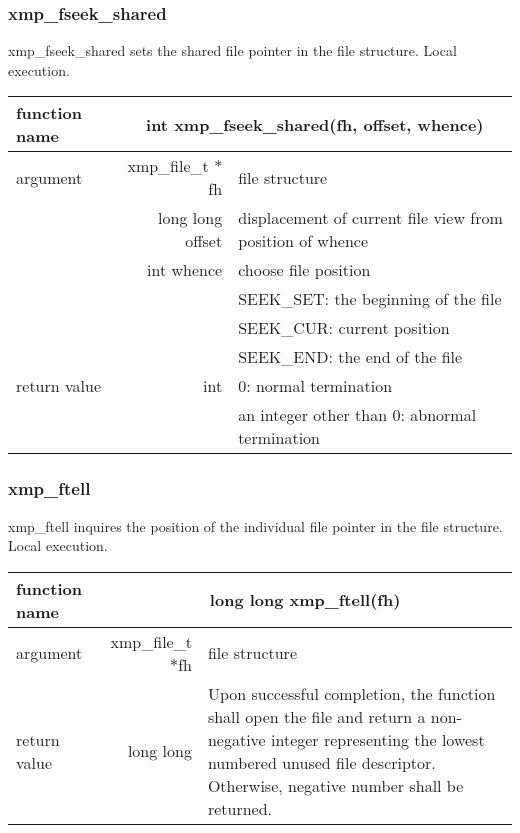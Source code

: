    \clearpage

   \subsubsection{xmp\_fseek\_shared}
   xmp\_fseek\_shared sets the shared file pointer in the file structure. Local execution.

   \begin{table}[h]
    \begin{center}
     \begin{tabular}{|l|r|p{80mm}|}
      \hline
      {\bf function name}  & \multicolumn{2}{c|}{\bf int xmp\_fseek\_shared(fh,
      offset, whence)}  \\ \hline \hline
      argument & xmp\_file\_t $*$fh & file structure \\ \cline{2-3}
      & long long offset & displacement of current file view from
	      position of whence \\ \cline{2-3}
      & int whence & choose file position \\
      &  & SEEK\_SET: the beginning of the file \\ 
      &  & SEEK\_CUR: current position \\ 
      &  & SEEK\_END: the end of the file \\ \hline
      return value & int & 0: normal termination \\
      &  & an integer other than 0: abnormal termination \\ \hline
      \end{tabular}
     \end{center}
    \label{tb:aaa}
   \end{table}

   \subsubsection{xmp\_ftell}
   xmp\_ftell inquires the position of the individual file pointer in the file structure. Local execution.

   \begin{table}[h]
    \begin{center}
     \begin{tabular}{|l|r|p{80mm}|}
      \hline
      {\bf function name}  & \multicolumn{2}{c|}{\bf long long
      xmp\_ftell(fh)} \\ \hline \hline
      argument & xmp\_file\_t $*$fh & file structure \\ \hline
      return value & long long & Upon successful completion, the
	      function shall open the file and return a non-negative
	      integer representing the lowest numbered unused file
	      descriptor. Otherwise, negative number shall be
	      returned. \\ \hline
      \end{tabular}
     \end{center}
    \label{tb:aaa}
   \end{table}

